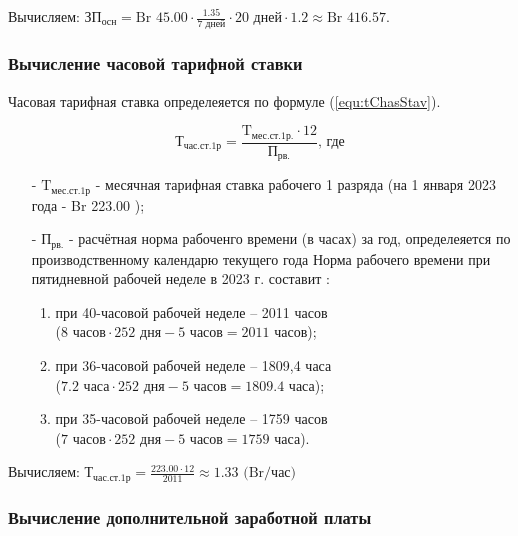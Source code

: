 Вычисляем: $\text{ЗП}_\text{осн} = \text{Br } 45.00 \cdot \frac{ 1.35 }{ 7 \text{ дней}  } \cdot 20 \text{ дней} \cdot 1.2 \approx \text{Br } 416.57$.

\subsubsection*{Вычисление часовой тарифной ставки}

Часовая тарифная ставка определеяется по формуле (\ref{equ:tChasStav}).

\begin{equation}
    \label{equ:tChasStav}
    \text{Т}_\text{час.ст.1р} = \frac{ \text{T}_\text{мес.ст.1р.} \cdot 12 }{ \text{П}_\text{рв.} } \text{, где}
\end{equation}

\begin{enumerate}
    \item[-] $\text{T}_\text{мес.ст.1р}$ - месячная тарифная ставка рабочего 1 разряда (на 1 января 2023 года - Br 223.00 \cite{RBstavka});
    \item[-] $\text{П}_\text{рв.}$ - расчётная норма рабоченго времени (в часах) за год,
    определеяется по производственному календарю текущего года
    Норма рабочего времени при пятидневной рабочей неделе в 2023 г. составит \cite{RBnormRabVrem}:
    \begin{enumerate}
        \item при 40-часовой рабочей неделе – 2011 часов \\
        ($8 \text{ часов} \cdot 252 \text{ дня} - 5 \text{ часов} = 2011 \text{ часов}$);
        \item при 36-часовой рабочей неделе – 1809,4 часа \\
        ($7.2 \text{ часа} \cdot 252 \text{ дня} - 5 \text{ часов} = 1809.4 \text{ часа}$);
        \item при 35-часовой рабочей неделе – 1759 часов \\
        ($7 \text{ часов} \cdot 252 \text{ дня} - 5 \text{ часов} = 1759 \text{ часа}$).
    \end{enumerate}
\end{enumerate}

Вычисляем: $\text{Т}_\text{час.ст.1р} = \frac{ 223.00 \cdot 12 }{ 2011 } \approx 1.33 \text{ (Br/час)}$

\subsubsection*{Вычисление дополнительной заработной платы}

